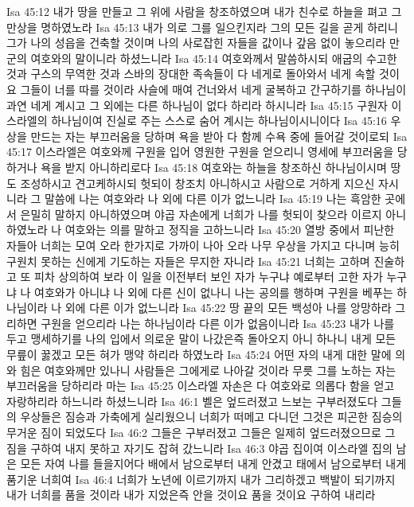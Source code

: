 Isa 45:12  내가 땅을 만들고 그 위에 사람을 창조하였으며 내가 친수로 하늘을 펴고 그 만상을 명하였노라
Isa 45:13  내가 의로 그를 일으킨지라 그의 모든 길을 곧게 하리니 그가 나의 성읍을 건축할 것이며 나의 사로잡힌 자들을 값이나 갚음 없이 놓으리라 만군의 여호와의 말이니라 하셨느니라
Isa 45:14  여호와께서 말씀하시되 애굽의 수고한 것과 구스의 무역한 것과 스바의 장대한 족속들이 다 네게로 돌아와서 네게 속할 것이요 그들이 너를 따를 것이라 사슬에 매여 건너와서 네게 굴복하고 간구하기를 하나님이 과연 네게 계시고 그 외에는 다른 하나님이 없다 하리라 하시니라
Isa 45:15  구원자 이스라엘의 하나님이여 진실로 주는 스스로 숨어 계시는 하나님이시니이다
Isa 45:16  우상을 만드는 자는 부끄러움을 당하며 욕을 받아 다 함께 수욕 중에 들어갈 것이로되
Isa 45:17  이스라엘은 여호와께 구원을 입어 영원한 구원을 얻으리니 영세에 부끄러움을 당하거나 욕을 받지 아니하리로다
Isa 45:18  여호와는 하늘을 창조하신 하나님이시며 땅도 조성하시고 견고케하시되 헛되이 창조치 아니하시고 사람으로 거하게 지으신 자시니라 그 말씀에 나는 여호와라 나 외에 다른 이가 없느니라
Isa 45:19  나는 흑암한 곳에서 은밀히 말하지 아니하였으며 야곱 자손에게 너희가 나를 헛되이 찾으라 이르지 아니하였노라 나 여호와는 의를 말하고 정직을 고하느니라
Isa 45:20  열방 중에서 피난한 자들아 너희는 모여 오라 한가지로 가까이 나아 오라 나무 우상을 가지고 다니며 능히 구원치 못하는 신에게 기도하는 자들은 무지한 자니라
Isa 45:21  너희는 고하며 진술하고 또 피차 상의하여 보라 이 일을 이전부터 보인 자가 누구냐 예로부터 고한 자가 누구냐 나 여호와가 아니냐 나 외에 다른 신이 없나니 나는 공의를 행하며 구원을 베푸는 하나님이라 나 외에 다른 이가 없느니라
Isa 45:22  땅 끝의 모든 백성아 나를 앙망하라 그리하면 구원을 얻으리라 나는 하나님이라 다른 이가 없음이니라
Isa 45:23  내가 나를 두고 맹세하기를 나의 입에서 의로운 말이 나갔은즉 돌아오지 아니 하나니 내게 모든 무릎이 꿇겠고 모든 혀가 맹약 하리라 하였노라
Isa 45:24  어떤 자의 내게 대한 말에 의와 힘은 여호와께만 있나니 사람들은 그에게로 나아갈 것이라 무릇 그를 노하는 자는 부끄러움을 당하리라 마는
Isa 45:25  이스라엘 자손은 다 여호와로 의롭다 함을 얻고 자랑하리라 하느니라 하셨느니라
Isa 46:1  벨은 엎드러졌고 느보는 구부러졌도다 그들의 우상들은 짐승과 가축에게 실리웠으니 너희가 떠메고 다니던 그것은 피곤한 짐승의 무거운 짐이 되었도다
Isa 46:2  그들은 구부러졌고 그들은 일제히 엎드러졌으므로 그 짐을 구하여 내지 못하고 자기도 잡혀 갔느니라
Isa 46:3  야곱 집이여 이스라엘 집의 남은 모든 자여 나를 들을지어다 배에서 남으로부터 내게 안겼고 태에서 남으로부터 내게 품기운 너희여
Isa 46:4  너희가 노년에 이르기까지 내가 그리하겠고 백발이 되기까지 내가 너희를 품을 것이라 내가 지었은즉 안을 것이요 품을 것이요 구하여 내리라
